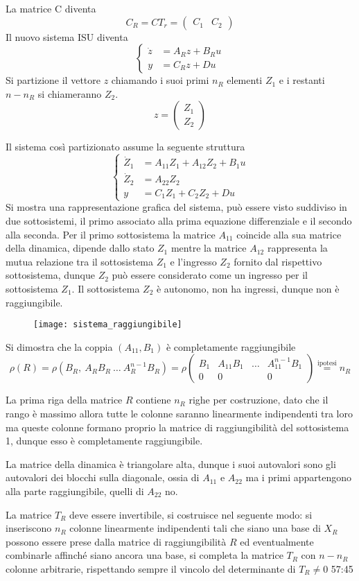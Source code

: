 La matrice C diventa
$$
C_R = CT_r = \begin{pmatrix}
              C_1 & C_2
             \end{pmatrix}
$$
Il nuovo sistema ISU diventa
$$
\left\{\begin{aligned}
\dot{z} &= A_R z + B_R u \\
y &= C_Rz + Du
\end{aligned}\right.
$$
Si partizione il vettore $z$ chiamando i suoi primi $n_R$ elementi $Z_1$ e i
restanti $n-n_R$ si chiameranno $Z_2$.
$$
z = \begin{pmatrix}
Z_1 \\ Z_2
\end{pmatrix}
$$

Il sistema così partizionato assume la seguente struttura
$$
\left\{\begin{aligned}
\dot{Z}_1 &= A_{11}Z_1 + A_{12} Z_2 + B_1 u\\
\dot{Z}_2 &= A_{22}Z_2\\
y &= C_1Z_1 + C_2 Z_2 +Du
\end{aligned}\right.
$$
Si mostra una rappresentazione grafica del sistema, può essere visto suddiviso
in due sottosistemi, il primo associato alla prima equazione differenziale e il
secondo alla seconda.
Per il primo sottosistema la matrice $A_{11}$ coincide alla sua matrice della
dinamica, dipende dallo stato $Z_1$ mentre la matrice $A_{12}$ rappresenta la
mutua relazione tra il sottosistema $Z_1$ e l'ingresso $Z_2$ fornito dal
rispettivo sottosistema, dunque $Z_2$ può essere considerato come un ingresso
per il sottosistema $Z_1$.
Il sottosistema $Z_2$ è autonomo, non ha ingressi, dunque non è raggiungibile.
\begin{figure}[h]
 \centering
 \texttt{[image: sistema\_raggiungibile]}
\end{figure}

Si dimostra che la coppia $(A_{11},B_1)$ è completamente raggiungibile
$$
\rho({R}) = \rho\left(B_R,\ A_RB_R\ \dots\ A_R^{n-1}B_R\right) = \rho
\begin{pmatrix}
B_1 & A_{11}B_1 & \ldots & A_{11}^{n-1}B_1\\
 0  &     0     &        &   0
\end{pmatrix}
\stackrel{\text{ipotesi}}{=}n_R
$$

La prima riga della matrice $R$ contiene $n_R$ righe per costruzione, dato che
il rango è massimo allora tutte le colonne saranno linearmente indipendenti tra
loro ma queste colonne formano proprio la matrice di raggiungibilità del
sottosistema 1, dunque esso è completamente raggiungibile.

La matrice della dinamica è triangolare alta, dunque i suoi autovalori sono gli
autovalori dei blocchi sulla diagonale, ossia di $A_{11}$ e $A_{22}$ ma i primi
appartengono alla parte raggiungibile, quelli di $A_{22}$ no.

La matrice $T_R$ deve essere invertibile, si costruisce nel seguente modo: si
inseriscono $n_R$ colonne linearmente indipendenti tali che siano una base di
$X_R$ possono essere prese dalla matrice di raggiungibilità $R$ ed
eventualmente combinarle affinché siano ancora una base, si completa la matrice
$T_R$ con $n-n_R$ colonne arbitrarie, rispettando sempre il vincolo del
determinante di $T_R\neq 0$
57:45
